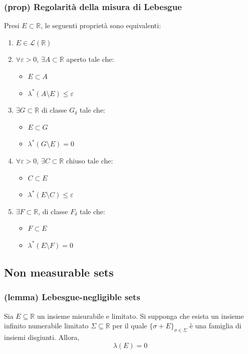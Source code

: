\subsubsection{(prop) Regolarità della misura di Lebesgue}
Presi $E\subset \mathbb R$, le seguenti proprietà sono equivalenti:
\begin{enumerate}[label=(\roman*)]
    \item $E\in \mathcal L(\mathbb R)$
    \item $\forall \varepsilon>0$, $\exists A \subset \mathbb R$ aperto tale che:
    \begin{itemize}
        \item $E\subset A$
        \item $\lambda^*(A\setminus E)\le \varepsilon$
    \end{itemize}
    \item $\exists G\subset \mathbb R$ di classe $G_\delta$ tale che:
        \begin{itemize}
            \item $E\subset G$
            \item $\lambda^*(G\setminus E)=0$
        \end{itemize}
    \item $\forall \varepsilon >0$, $\exists C\subset \mathbb R$ chiuso tale che:
    \begin{itemize}
        \item $C\subset E$
        \item $\lambda^*(E\setminus C)\le \varepsilon$
    \end{itemize}
    \item $\exists F\subset \mathbb R$, di classe $F_\delta$ tale che:
    \begin{itemize}
        \item $F\subset E$
        \item $\lambda^*(E\setminus F)=0$
    \end{itemize}
\end{enumerate}
\subsection{Non measurable sets}
\subsubsection{(lemma) Lebesgue-negligible sets}
Sia $E\subseteq \mathbb R$ un insieme misurabile e limitato. Si supponga che esista un insieme infinito numerabile limitato $\Sigma \subseteq \mathbb R$ per il quale $\{\sigma +E\}_{\sigma \in \Sigma}$ è una famiglia di insiemi disgiunti.
Allora, $$\lambda(E)=0$$
